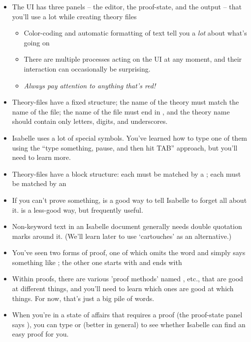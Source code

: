 \begin{itemize}
    \item The UI has three panels -- the editor, the proof-state, and the output -- that you'll use a lot while creating theory files

\begin{itemize}
        \item Color-coding and automatic formatting of text tell you a \textit{lot} about what's going on
        \item There are multiple processes acting on the UI at any moment, and their interaction can occasionally be surprising. 
        \item \textit{\textit{Always} pay attention to anything that's red!}
\end{itemize}

    \item Theory-files have a fixed structure; the name of the theory must match the name of the file; the name of the file must end in , and the theory name should contain only letters, digits, and underscores. 
    \item Isabelle uses a lot of special symbols. You've learned how to type one of them using the ``type something, pause, and then hit TAB'' approach, but you'll need to learn more. 
    \item Theory-files have a block structure: each  must be matched by a ; each  must be matched by an 
    \item If you can't prove something,  is a good way to tell Isabelle to forget all about it.  is a less-good way, but frequently useful.
    \item Non-keyword text in an Isabelle document generally needs double quotation marks around it. (We'll learn later to use `cartouches' as an alternative.)
    \item You've seen two forms of proof, one of which omits the word  and simply says something like ; the other one starts with  and ends with 
    \item Within proofs, there are various 'proof methods' named , etc., that are good at different things, and you'll need to learn which ones are good at which things. For now, that's just a big pile of words. 
    \item When you're in a state of affairs that requires a proof (the proof-state panel says ), you can type  or (better in general)  to see whether Isabelle can find an easy proof for you. 

\end{itemize}

